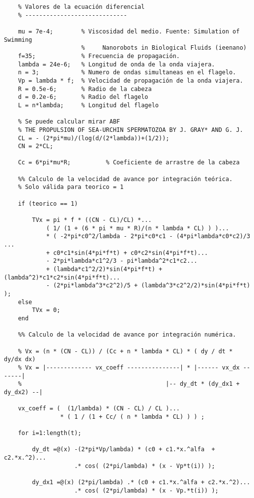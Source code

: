 \begin{lstlisting}[]
    % -----------------------------
    % Valores de la ecuación diferencial
    % -----------------------------

    mu = 7e-4;        % Viscosidad del medio. Fuente: Simulation of Swimming
                      %     Nanorobots in Biological Fluids (ieenano)
    f=35;             % Frecuencia de propagación.
    lambda = 24e-6;   % Longitud de onda de la onda viajera.
    n = 3;            % Numero de ondas simultaneas en el flagelo.      
    Vp = lambda * f;  % Velocidad de propagación de la onda viajera.
    R = 0.5e-6;       % Radio de la cabeza 
    d = 0.2e-6;       % Radio del flagelo
    L = n*lambda;     % Longitud del flagelo

    % Se puede calcular mirar ABF 
    % THE PROPULSION OF SEA-URCHIN SPERMATOZOA BY J. GRAY* AND G. J. 
    CL = - (2*pi*mu)/(log(d/(2*lambda))+(1/2));  
    CN = 2*CL;

    Cc = 6*pi*mu*R;          % Coeficiente de arrastre de la cabeza

    %% Calculo de la velocidad de avance por integración teórica.
    % Solo válida para teorico = 1

    if (teorico == 1)
        
        TVx = pi * f * ((CN - CL)/CL) *...
            ( 1/ (1 + (6 * pi * mu * R)/(n * lambda * CL) ) )...
            * ( -2*pi*c0^2/lambda - 2*pi*c0*c1 - (4*pi*lambda*c0*c2)/3 ...
            + c0*c1*sin(4*pi*f*t) + c0*c2*sin(4*pi*f*t)...
            - 2*pi*lambda*c1^2/3 - pi*lambda^2*c1*c2...
            + (lambda*c1^2/2)*sin(4*pi*f*t) + (lambda^2)*c1*c2*sin(4*pi*f*t)...
            - (2*pi*lambda^3*c2^2)/5 + (lambda^3*c2^2/2)*sin(4*pi*f*t) );
    else
        TVx = 0;
    end

    %% Calculo de la velocidad de avance por integración numérica.

    % Vx = (n * (CN - CL)) / (Cc + n * lambda * CL) * ( dy / dt * dy/dx dx)
    % Vx = |------------- vx_coeff ---------------| * |------ vx_dx -------|
    %                                         |-- dy_dt * (dy_dx1 + dy_dx2) --|

    vx_coeff = (  (1/lambda) * (CN - CL) / CL )...
                * ( 1 / (1 + Cc/ ( n * lambda * CL) ) ) ;

    for i=1:length(t);

        dy_dt =@(x) -(2*pi*Vp/lambda) * (c0 + c1.*x.^alfa  + c2.*x.^2)...
                    .* cos( (2*pi/lambda) * (x - Vp*t(i)) );

        dy_dx1 =@(x) (2*pi/lambda) .* (c0 + c1.*x.^alfa + c2.*x.^2)...
                    .* cos( (2*pi/lambda) * (x - Vp.*t(i)) );


\end{lstlisting}

